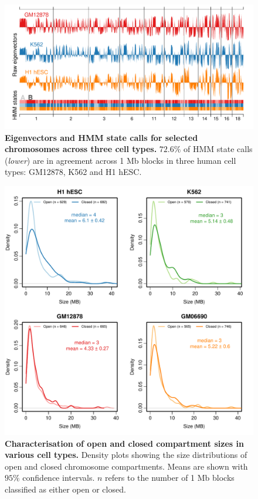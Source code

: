 \documentclass[a4paper]{report}
\begin{document}
\begin{figure}[H]
\begin{center}
\includegraphics[width=\textwidth]{figs/states.pdf}
\captionsetup{width=\textwidth}
\caption{ {\bf Eigenvectors and HMM state calls for selected chromosomes
  across three cell types.} $72.6\%$ of HMM state calls (\emph{lower}) are in
agreement across 1 Mb blocks in three human cell types: GM12878, K562
and H1 hESC.
}\label{fig:states}
\end{center}
\end{figure}

\begin{figure}[H]
\begin{center}
\includegraphics[width=.6\textwidth]{figs/s1.pdf}
\captionsetup{width=\textwidth}
\caption{ {\bf Characterisation of open and closed compartment sizes
    in various cell types.}  
Density plots showing the size distributions of open and closed
chromosome compartments. Means are shown with $95\%$ confidence intervals. $n$ refers to the number of 1 Mb blocks
classified as either open or closed.
}
\end{center} 
\end{figure} 
\end{document}
